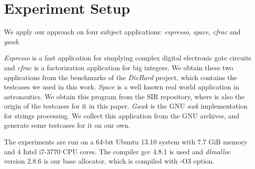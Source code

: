 
\section{Experiment Setup}
We apply our approach on four subject applications: \emph{espresso}, \emph{space}, \emph{cfrac} and \emph{gawk}.
\begin{table}[htbp]
\centering
\caption{subject applications}
\label{tab_sub_app}
\end{table}
\emph{Espresso} is a fast application for simplying complex digital electronic gate circuits and \emph{cfrac} is a factorization application for big integers. We obtain these two applications from the benchmarks of the \emph{DieHard} project, which contains the testcases we used in this work. \emph{Space} is a well known real world application in astronautics. We obtain this program from the SIR repository, where is also the origin of the testcases for it in this paper. \emph{Gawk} is the GNU \emph{awk} implementation for strings processing. We collect this application from the GNU archives, and generate some testcases for it on our own.

The experiments are run on a 64-bit Ubuntu 13.10 system with 7.7 GiB memory and 4 Intel i7-3770 CPU cores. The compiler gcc 4.8.1 is used and \emph{dlmalloc} version 2.8.6 is our base allocator, which is compiled with -O3 option.

